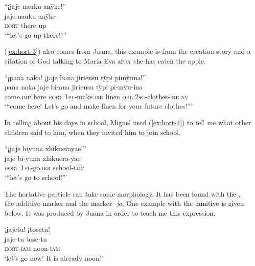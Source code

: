 \ea\label{ex:hort-2}
\begingl
\glpreamble “¡jaje nauku anÿke!”\\
\gla jaje nauku anÿke\\
\glb \textsc{hort} there up\\
\glft ‘“let’s go up there!”’
\endgl
\trailingcitation{[jxx-p151016l-2.102]}
\xe

(\ref{ex:hort-3}) also comes from Juana, this example is from the creation story and a citation of God talking to María Eva after she has eaten the apple.

\ea\label{ex:hort-3}
\begingl
\glpreamble “¡pana naka! ¡jaje bana jiriensu tÿpi pimÿuna!”\\
\gla pana naka jaje bi-ana jiriensu tÿpi pi-mÿu-ina\\
\glb come.\textsc{imp} here \textsc{hort} 1\textsc{pl}-make.\textsc{irr} linen \textsc{obl} 2\textsc{sg}-clothes-\textsc{irr.nv}\\
\glft ‘“come here! Let’s go and make linen for your future clothes!”’
\endgl
\trailingcitation{[jxx-n101013s-1.503]}
\xe

In telling about his days in school, Miguel used (\ref{ex:hort-4}) to tell me what other children said to him, when they invited him to join school.

\ea\label{ex:hort-4}
\begingl
\glpreamble “¡jaje biyuna xhikuerayae!”\\
\gla jaje bi-yuna xhikuera-yae\\
\glb \textsc{hort} 1\textsc{pl}-go.\textsc{irr} school-\textsc{loc}\\
\glft ‘“let’s go to school!”’
\endgl
\trailingcitation{[mxx-p181027l-1.006]}
\xe

The hortative particle can take some morphology. It has been found with the , the additive marker and the  marker \textit{-ja}. One example with the iamitive is given below. It was produced by Juana in order to teach me this expression. 

\ea\label{ex:hort-5}
\begingl
\glpreamble ¡jajetu! ¡tosetu!\\
\gla jaje-tu tose-tu\\
\glb \textsc{hort}-\textsc{iam} noon-\textsc{iam}\\
\glft ‘let’s go now! It is already noon!’
\endgl
\trailingcitation{[jxx-e110923l-1.084]}
\xe


